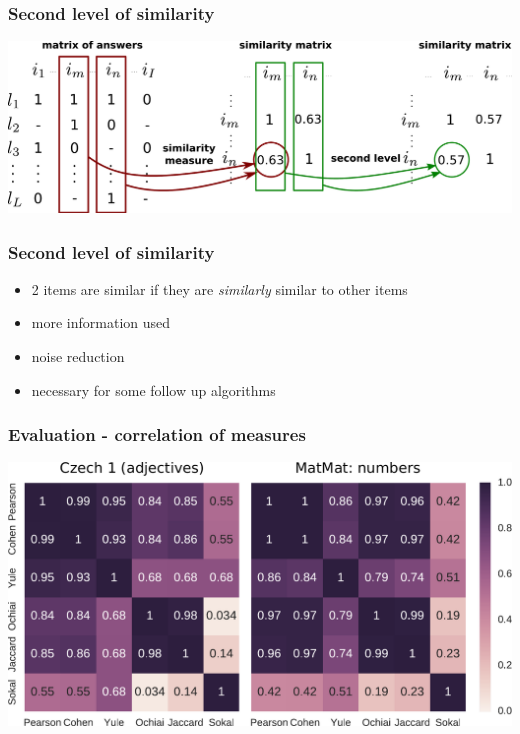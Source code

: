 \documentclass[xcolor=svgnames]{beamer}
\begin{document}
\begin{frame}
    \frametitle{Second level of similarity}
    \centering
    \includegraphics[width=\linewidth]{figures/diagram-second-step}
\end{frame}
\begin{frame}
    \frametitle{Second level of similarity}
    \Large
    \begin{itemize}
        \item 2 items are similar if they are \emph{similarly} similar to other items
        \item more information used
        \item noise reduction
        \item necessary for some follow up algorithms
    \end{itemize}
\end{frame}
\begin{frame}
    \frametitle{Evaluation - correlation of measures}
    \includegraphics[width=\linewidth]{figures/measures-correlations}
\end{frame}
\end{document}
